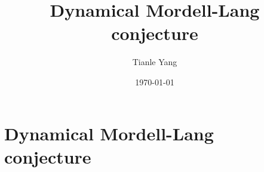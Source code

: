 \documentclass[sectionlevel=section,status=draft]{noteformyself}
\title{Dynamical Mordell-Lang conjecture}
\author{Tianle Yang}
\date{\today}
\begin{document}
\maketitle

    \section[
      status=draft,
      tag=00000,
      label=\labelNFM{sec:periodic-points-and-orbits:dynamical-mordell-lang-conjecture}
    ]{Dynamical Mordell-Lang conjecture}



\end{document}
